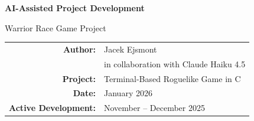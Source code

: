 \documentclass[12pt,a4paper]{article}
\begin{document}
\begin{titlepage}
    \centering
    \vspace*{4cm}
    
    {\Huge\bfseries AI-Assisted Project Development\par}
    
    \vspace{1cm}
    
    {\Large Warrior Race Game Project\par}
    
    \vspace{2cm}
    
    \begin{tabular}{rl}
        \textbf{Author:} & Jacek Ejsmont \\
        \textbf{} & in collaboration with Claude Haiku 4.5 \\
        \textbf{Project:} & Terminal-Based Roguelike Game in C \\
        \textbf{Date:} & January 2026 \\
        \textbf{Active Development:} & November -- December 2025 \\
    \end{tabular}
    
    \vspace{1cm}
\end{titlepage}


\tableofcontents
\newpage

\end{document}
